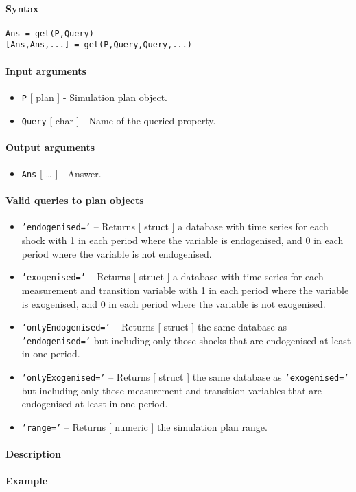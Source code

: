 


	\paragraph{Syntax}

\begin{verbatim}
Ans = get(P,Query)
[Ans,Ans,...] = get(P,Query,Query,...)
\end{verbatim}

\paragraph{Input arguments}

\begin{itemize}
\item
  \texttt{P} {[} plan {]} - Simulation plan object.
\item
  \texttt{Query} {[} char {]} - Name of the queried property.
\end{itemize}

\paragraph{Output arguments}

\begin{itemize}
\itemsep1pt\parskip0pt
\item
  \texttt{Ans} {[} \ldots{} {]} - Answer.
\end{itemize}

\paragraph{Valid queries to plan
objects}

\begin{itemize}
\item
  \texttt{'endogenised='} -- Returns {[} struct {]} a database with time
  series for each shock with 1 in each period where the variable is
  endogenised, and 0 in each period where the variable is not
  endogenised.
\item
  \texttt{'exogenised='} -- Returns {[} struct {]} a database with time
  series for each measurement and transition variable with 1 in each
  period where the variable is exogenised, and 0 in each period where
  the variable is not exogenised.
\item
  \texttt{'onlyEndogenised='} -- Returns {[} struct {]} the same
  database as \texttt{'endogenised='} but including only those shocks
  that are endogenised at least in one period.
\item
  \texttt{'onlyExogenised='} -- Returns {[} struct {]} the same database
  as \texttt{'exogenised='} but including only those measurement and
  transition variables that are endogenised at least in one period.
\item
  \texttt{'range='} -- Returns {[} numeric {]} the simulation plan
  range.
\end{itemize}

\paragraph{Description}

\paragraph{Example}


